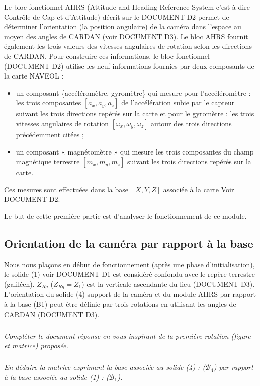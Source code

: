 \documentclass[10pt,fleqn]{article} %
\begin{document}
Le bloc fonctionnel AHRS (Attitude and Heading Reference System c’est-à-dire Contrôle de Cap et d’Attitude) décrit sur le DOCUMENT D2 permet de déterminer l’orientation (la position angulaire) de la caméra dans l’espace au moyen des angles de CARDAN (voir DOCUMENT D3). Le bloc AHRS fournit également les trois valeurs des vitesses angulaires de rotation selon les directions de CARDAN. 
Pour construire ces informations, le bloc fonctionnel (DOCUMENT D2) utilise les neuf informations fournies par deux composants de la carte NAVEOL :
 \begin{itemize}
 \item un composant \{accéléromètre, gyromètre\} qui mesure pour l’accéléromètre : les trois composantes $[a_x, a_y, a_z]$ de l’accélération subie par le capteur suivant les trois directions repérés sur la carte et pour le gyromètre : les trois vitesses angulaires de rotation $[\omega_x,\omega_y,\omega_z]$ autour des trois directions précédemment citées ;
 \item un composant  « magnétomètre » qui mesure les trois composantes du champ magnétique terrestre $[m_x, m_y, m_z]$ suivant les trois directions repérés sur la carte.
 \end{itemize}
Ces mesures sont effectuées dans la base $[X, Y, Z]$ associée à la carte Voir DOCUMENT D2.

Le but de cette première partie est d’analyser le fonctionnement de ce module. 

\subsection{Orientation de la caméra par rapport à la base}
Nous nous plaçons en début de fonctionnement (après une phase d’initialisation), le solide (1) voir DOCUMENT D1 est considéré confondu avec le repère terrestre (galiléen). $Z_{Rg}$ ($Z_{Rg}=Z_1$) est la verticale ascendante du lieu (DOCUMENT D3). L’orientation du solide (4) support de la caméra et du module AHRS par rapport à la base (B1) peut être définie par trois rotations en utilisant les angles de CARDAN  (DOCUMENT D3).

\subparagraph{\label{q12}}\textit{Compléter le document réponse en vous inspirant de la première rotation (figure et matrice) proposée.}

\subparagraph{\label{q13}}\textit{En déduire la matrice exprimant la base associée au solide (4) : ($\mathcal{B}_4$) par rapport à la base associée au solide (1) : ($\mathcal{B}_1$).}
 
\end{document}
